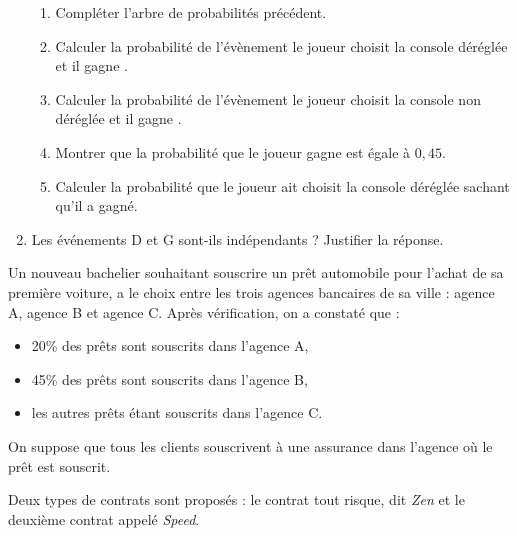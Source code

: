 \documentclass[a4paper,11pt]{article}
\begin{document}
\begin{enumerate}
\begin{center}
	\end{center}
%
	\begin{enumerate}
		\item Compléter l'arbre de probabilités précédent. 
		\item Calculer la probabilité de l'évènement \og le joueur choisit la console déréglée et il gagne \fg. 
		\item Calculer la probabilité de l'évènement \og le joueur choisit la console non déréglée et il gagne \fg. 
		\item Montrer que la probabilité que le joueur gagne est égale à $0,45$. 
		\item Calculer la probabilité que le joueur ait choisit la console déréglée sachant qu'il a gagné.
	\end{enumerate}
	\item Les événements D et G sont-ils indépendants ? Justifier la réponse.
\end{enumerate}

\bigskip


\medskip

Un nouveau bachelier souhaitant souscrire un prêt automobile pour l'achat de sa première voiture, a le choix entre les trois agences bancaires de sa ville : agence A, agence B et agence C. Après vérification, on a constaté que :
%
\begin{itemize}[topsep=1pt]
	\item 20\:\% des prêts sont souscrits dans l'agence A,
	\item 45\:\% des prêts sont souscrits dans l'agence B,
	\item les autres prêts étant souscrits dans l'agence C. 
\end{itemize}
%
On suppose que tous les clients souscrivent à une assurance dans l'agence où le prêt est souscrit.

Deux types de contrats sont proposés : le contrat tout risque, dit \emph{Zen} et le deuxième contrat appelé \emph{Speed}.
\end{document}
